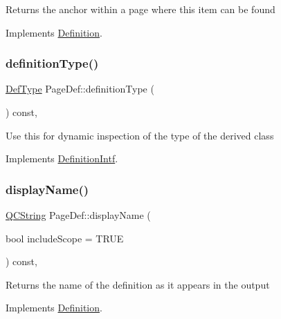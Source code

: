 Returns the anchor within a page where this item can be found 

Implements \mbox{\hyperlink{class_definition_a56e91f9b76f41208a22cfb2336871604}{Definition}}.

\mbox{\label{class_page_def_a4485734f9ef865738e090ff6b122410f}} 
\subsubsection{\texorpdfstring{definitionType()}{definitionType()}}
{\footnotesize\ttfamily \mbox{\hyperlink{class_definition_intf_ada60114bc621669dd8c19edfc6421766}{Def\+Type}} Page\+Def\+::definition\+Type (\begin{DoxyParamCaption}{ }\end{DoxyParamCaption}) const\hspace{0.3cm}{\ttfamily [inline]}, {\ttfamily [virtual]}}

Use this for dynamic inspection of the type of the derived class 

Implements \mbox{\hyperlink{class_definition_intf_ac8ee00bc1af5558ae37f6896d16f5a3a}{Definition\+Intf}}.

\mbox{\label{class_page_def_a29e7f4617718d605639095833d42d0a0}} 
\subsubsection{\texorpdfstring{displayName()}{displayName()}}
{\footnotesize\ttfamily \mbox{\hyperlink{class_q_c_string}{Q\+C\+String}} Page\+Def\+::display\+Name (\begin{DoxyParamCaption}\item[{bool}]{include\+Scope = {\ttfamily TRUE} }\end{DoxyParamCaption}) const\hspace{0.3cm}{\ttfamily [inline]}, {\ttfamily [virtual]}}

Returns the name of the definition as it appears in the output 

Implements \mbox{\hyperlink{class_definition_ac4741f70f06baac174cf71b3e11d06ac}{Definition}}.

\mbox{\label{class_page_def_a7b72dba48ce4045351aed9a397ce9b0f}} 
